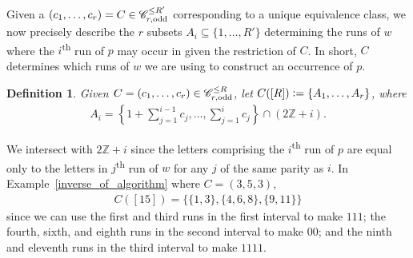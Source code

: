 \documentclass[11pt]{amsart}
\newcommand{\defeq}{\vcentcolon=}
\newtheorem{definition}[theorem]{Definition}
\newtheorem{ex}[theorem]{Example}
\newcommand{\ZZ}{\mathbb{Z}}
\begin{document}

Given a $(c_1,\dots,c_r)=C\in \mathscr{C}_{r,\text{\normalfont odd}}^{\leq R'}$ corresponding to a unique equivalence class, we now precisely describe the $r$ subsets $A_i\subseteq\{1,\dots,R'\}$ determining the runs of $w$ where the $i$\textsuperscript{th} run of $p$ may occur in given the restriction of $C$. In short, $C$ determines which runs of $w$ we are using to construct an occurrence of $p$.

\begin{definition}
    Given $C=(c_1,\dots,c_{r})\in\mathscr{C}_{r,\text{\normalfont odd}}^{\leq R}$, let $C([R])\defeq\{A_1,\dots,A_{r}\}$, where
    \begin{align*}
        A_i=\left\{1+\sum_{j=1}^{i-1}c_j,\dots,\sum_{j=1}^{i}c_j\right\}\cap(2\ZZ+i).
    \end{align*}
\end{definition}

We intersect with $2\ZZ+i$ since the letters comprising the $i$\textsuperscript{th} run of $p$ are equal only to the letters in $j$\textsuperscript{th} run of $w$ for any $j$ of the same parity as $i$. In Example~\ref{inverse_of_algorithm} where $C=(3,5,3)$,
\begin{align*}
    C([15])=\{\{1,3\},\{4,6,8\},\{9,11\}\}
\end{align*}
since we can use the first and third runs in the first interval to make $111$; the fourth, sixth, and eighth runs in the second interval to make $00$; and the ninth and eleventh runs in the third interval to make $1111$.
\end{document}

